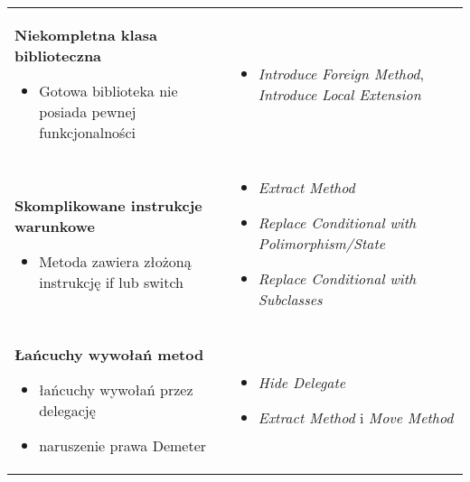 \documentclass[../main.tex]{subfiles}
\begin{document}
\begin{table}[H]
\begin{center}
\begin{tabular}{ p{.35\linewidth} p{.65\linewidth} }
                \cmidrule(r){1-1}\cmidrule(l){2-2}
                \textbf{Niekompletna klasa biblioteczna}
                \begin{itemize}
                    \item Gotowa biblioteka nie posiada pewnej funkcjonalności
                \end{itemize}
                &
                \begin{itemize}
                    \item \textit{Introduce Foreign Method}, \textit{Introduce Local Extension}
                \end{itemize}
                \\

                \cmidrule(r){1-1}\cmidrule(l){2-2}
                \textbf{Skomplikowane instrukcje warunkowe}
                \begin{itemize}
                    \item Metoda zawiera złożoną instrukcję if lub switch
                \end{itemize}
                &
                \begin{itemize}
                    \item \textit{Extract Method}
                    \item \textit{Replace Conditional with Polimorphism/State}
                    \item \textit{Replace Conditional with Subclasses}
                \end{itemize}
                \\

                \cmidrule(r){1-1}\cmidrule(l){2-2}
                \textbf{Łańcuchy wywołań metod}
                \begin{itemize}
                    \item łańcuchy wywołań przez delegację
                    \item naruszenie prawa Demeter
                \end{itemize}
                &
                \begin{itemize}
                    \item \textit{Hide Delegate}
                    \item \textit{Extract Method} i \textit{Move Method}
                \end{itemize}
                \\

            \end{tabular}
        \end{center}
    \end{table}
\end{document}
